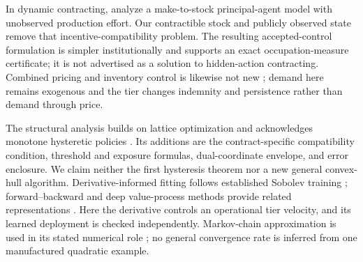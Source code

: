 \documentclass[11pt,letterpaper]{article}
\theoremstyle{definition}
\newcommand{\1}{\mathbf 1}
\begin{document}
In dynamic contracting, \citet{PlambeckZenios2003} analyze a make-to-stock principal-agent model with unobserved production effort. Our contractible stock and publicly observed state remove that incentive-compatibility problem. The resulting accepted-control formulation is simpler institutionally and supports an exact occupation-measure certificate; it is not advertised as a solution to hidden-action contracting. Combined pricing and inventory control is likewise not new \citep{FedergruenHeching1999}; demand here remains exogenous and the tier changes indemnity and persistence rather than demand through price.

The structural analysis builds on lattice optimization \citep{Topkis1978} and acknowledges monotone hysteretic policies \citep{HippHolzbaur1988}. Its additions are the contract-specific compatibility condition, threshold and exposure formulas, dual-coordinate envelope, and error enclosure. We claim neither the first hysteresis theorem nor a new general convex-hull algorithm. Derivative-informed fitting follows established Sobolev training \citep{Czarnecki2017}; forward--backward and deep value-process methods provide related representations \citep{MaProtterYong1994,HanJentzenE2018}. Here the derivative controls an operational tier velocity, and its learned deployment is checked independently. Markov-chain approximation is used in its stated numerical role \citep{KushnerDupuis2001}; no general convergence rate is inferred from one manufactured quadratic example.







\clearpage

\end{document}
